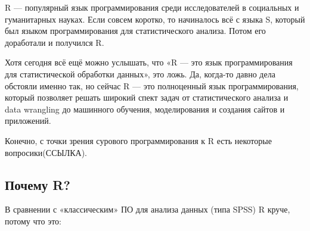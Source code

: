 \documentclass[
  letterpaper,
]{scrbook}
\theoremstyle{definition}
\theoremstyle{remark}
\begin{document}
R --- популярный язык программирования среди исследователей в социальных
и гуманитарных науках. Если совсем коротко, то начиналось всё с языка S,
который был языком программирования для статистического анализа. Потом
его доработали и получился R.

Хотя сегодня всё ещё можно услышать, что «R --- это язык
программирования для статистической обработки данных», это ложь. Да,
когда-то давно дела обстояли именно так, но сейчас R --- это полноценный
язык программирования, который позволяет решать широкий спект задач от
статистического анализа и data wrangling до машинного обучения,
моделирования и создания сайтов и приложений.

Конечно, с точки зрения сурового программирования к R есть некоторые
вопросики(ССЫЛКА).

\subsection{Почему R?}\label{rbasics-why-r}

В сравнении с «классическим» ПО для анализа данных (типа SPSS) R круче,
потому что это:
\end{document}
